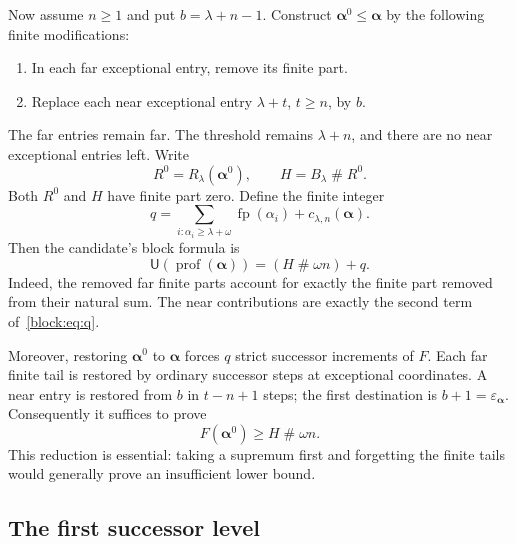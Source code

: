 \documentclass[11pt,a4paper]{article}
\theoremstyle{definition}
\newcommand{\ns}{\mathbin{\#}}
\newcommand{\FunU}{\mathsf U}
\newcommand{\prof}{\operatorname{prof}}
\newcommand{\seq}[1]{\boldsymbol{#1}}
\newcommand{\fp}{\operatorname{fp}}
\newcommand{\epsa}{\varepsilon_{\seq\alpha}}
\begin{document}
Now assume $n\ge1$ and put $b=\lambda+n-1$. Construct $\seq\alpha^0\le\seq\alpha$ by the following finite modifications:

\begin{enumerate}[label=(\roman*),itemsep=2pt,topsep=3pt]
\item In each far exceptional entry, remove its finite part.
\item Replace each near exceptional entry $\lambda+t$, $t\ge n$, by $b$.
\end{enumerate}

The far entries remain far. The threshold remains $\lambda+n$, and there are no near exceptional entries left. Write
\[
 R^0=R_\lambda(\seq\alpha^0),\qquad H=B_\lambda\ns R^0.
\]
Both $R^0$ and $H$ have finite part zero. Define the finite integer
\begin{equation}\label{block:eq:q}
 q=\sum_{i:\alpha_i\ge\lambda+\omega}\fp(\alpha_i)
       +c_{\lambda,n}(\seq\alpha).
\end{equation}
Then the candidate's block formula is
\begin{equation}\label{block:eq:restore-target}
 \FunU(\prof(\seq\alpha))=(H\ns\omega n)+q.
\end{equation}
Indeed, the removed far finite parts account for exactly the finite part removed from their natural sum. The near contributions are exactly the second term of~\eqref{block:eq:q}.

Moreover, restoring $\seq\alpha^0$ to $\seq\alpha$ forces $q$ strict successor increments of $F$. Each far finite tail is restored by ordinary successor steps at exceptional coordinates. A near entry is restored from $b$ in $t-n+1$ steps; the first destination is $b+1=\epsa$. Consequently it suffices to prove
\begin{equation}\label{block:eq:core-lower}
 F(\seq\alpha^0)\ge H\ns\omega n.
\end{equation}
This reduction is essential: taking a supremum first and forgetting the finite tails would generally prove an insufficient lower bound.

\subsection{The first successor level}
\end{document}
